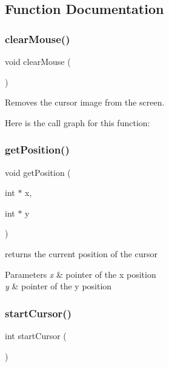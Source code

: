 \subsection{Function Documentation}
\mbox{\label{group__cursor_gaf48e820503f0becc55d9eb740bffe3e8}} 
\subsubsection{\texorpdfstring{clearMouse()}{clearMouse()}}
{\footnotesize\ttfamily void clear\+Mouse (\begin{DoxyParamCaption}{ }\end{DoxyParamCaption})}



Removes the cursor image from the screen. 

Here is the call graph for this function\+:
\mbox{\label{group__cursor_gac47a960acd2af3996c2b28d8150dcd8c}} 
\subsubsection{\texorpdfstring{getPosition()}{getPosition()}}
{\footnotesize\ttfamily void get\+Position (\begin{DoxyParamCaption}\item[{int $\ast$}]{x,  }\item[{int $\ast$}]{y }\end{DoxyParamCaption})}



returns the current position of the cursor 


\begin{DoxyParams}{Parameters}
{\em x} & pointer of the x position \\
\hline
{\em y} & pointer of the y position \\
\hline
\end{DoxyParams}
\mbox{\label{group__cursor_ga832ef8a00055d81e9bbba145f018eefe}} 
\subsubsection{\texorpdfstring{startCursor()}{startCursor()}}
{\footnotesize\ttfamily int start\+Cursor (\begin{DoxyParamCaption}{ }\end{DoxyParamCaption})}



